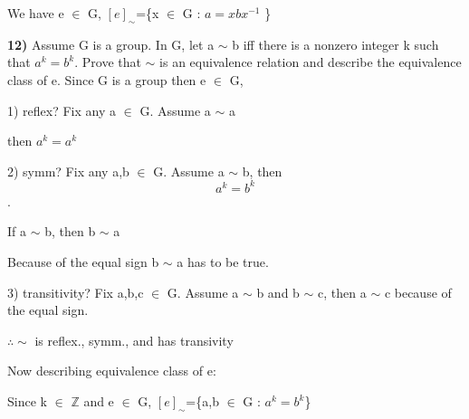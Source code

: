\documentclass{article}
\begin{document}
We have e $\in$ G, $[e]_{\sim}$=\{x $\in$ G : $a=xbx^{-1}$ \}

\newpage

\textbf{12)} Assume G is a group. In G, let a $\sim$ b iff there is a nonzero
integer k such that $a^{k} = b^{k}$. 
Prove that $\sim$ is an equivalence relation and describe the equivalence class of e. Since G is a group then e $\in$ G, 

\medskip

1) reflex? Fix any a $\in$ G. Assume a $\sim$ a


then  $a^{k} = a^{k}$

\medskip

2) symm? Fix any a,b $\in$ G. Assume a $\sim$ b, then $$a^{k}=b^{k}$$.


If a $\sim$ b, then b $\sim$ a



Because of the equal sign b $\sim$ a has to be true. 


\medskip


3) transitivity? Fix a,b,c $\in$ G. Assume a $\sim$ b and b $\sim$ c, then a $\sim$ c because of the equal sign.

\medskip

$\therefore \sim$ is reflex., symm., and has transivity

\medskip

Now describing equivalence class of e: 

\medskip


Since k $\in$ $\mathbb{Z}$ and e $\in$ G, $[e]_{\sim}$=\{a,b $\in$ G : $a^{k}=b^{k}$\}
\end{document}
